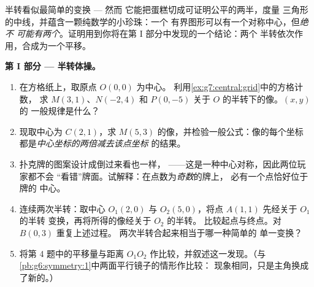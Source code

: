 \begin{problem}
\label{pb:g7:central:1}
半转看似最简单的变换 --- 然而
它能把蛋糕切成可证明公平的两半，度量
三角形的中线，并蕴含一颗纯数学的小珍珠：一个
有界图形可以有一个对称中心，但\emph{绝不
可能有两个}。证明用到你将在第 I 部分中发现的一个结论：两个
半转依次作用，合成为一个平移。

\medskip
\noindent\textbf{第 I 部分 --- 半转体操。}
\begin{enumerate}
  \item 在方格纸上，取原点 $O(0, 0)$ 为中心。
        利用\cref{ex:g7:central:grid}中的方格计数，
        求 $M(3, 1)$、$N(-2, 4)$ 和
        $P(0, -5)$ 关于 $O$ 的半转下的像。$(x, y)$ 的
        一般规律是什么？
  \item 现取中心为 $C(2, 1)$，求
        $M(5, 3)$ 的像，并检验一般公式：像的每个坐标
        都是\emph{中心坐标的两倍减去该点坐标}
        的结果。
  \item 扑克牌的图案设计成倒过来看也一样，
        ——这是一种中心对称，因此两位玩家都不会
        “看错”牌面。试解释：在点数为\emph{奇数}的牌上，
        必有一个点恰好位于牌的
        中心。
  \item 连续两次半转：取中心 $O_1(2, 0)$
        与 $O_2(5, 0)$，将点 $A(1, 1)$ 先经关于 $O_1$ 的半转
        变换，再将所得的像经关于 $O_2$ 的半转。
        比较起点与终点。对 $B(0, 3)$ 重复上述过程。
        两次半转合起来相当于哪一种简单的
        单一变换？
  \item 将第 4 题中的平移量与距离
        $O_1 O_2$ 作比较，并叙述这一发现。（与
        \cref{pb:g6:symmetry:1}中两面平行镜子的情形作比较：
        现象相同，只是主角换成了新的。）
\end{enumerate}


\end{problem}
